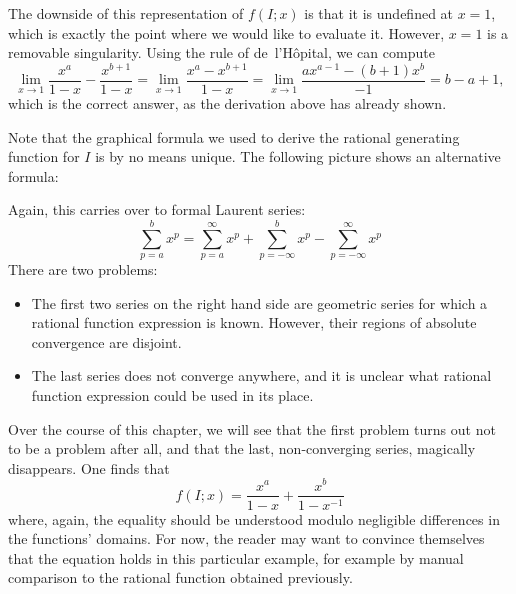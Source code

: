 The downside of this representation of $f(I;x)$ is that it is undefined at $x = 1$,
which is exactly the point where we would like to evaluate it.
However, $x = 1$ is a removable singularity.
Using the rule of de~l'Hôpital, we can compute
\[
  \lim_{x \to 1} \frac{x^a}{1 - x} - \frac{x^{b + 1}}{1 - x} = \lim_{x \to 1} \frac{x^a - x^{b+1}}{1 - x} = \lim_{x \to 1} \frac{a x^{a-1} - (b+1) x^b}{-1} = b - a + 1,
\]
which is the correct answer, as the derivation above has already shown.

Note that the graphical formula we used to derive the rational generating function for $I$ is by no means unique.
The following picture shows an alternative formula:
\begin{center}
\end{center}
Again, this carries over to formal Laurent series:
\[
  \sum_{p = a}^b x^p = \sum_{p = a}^\infty x^p + \sum_{p = -\infty}^b x^p - \sum_{p = -\infty}^\infty x^p
\]
There are two problems:
\begin{itemize}
  \item The first two series on the right hand side are geometric series for which a rational function expression is known.
    However, their regions of absolute convergence are disjoint.
  
  \item The last series does not converge anywhere, and it is unclear what rational function expression could be used in its place.
\end{itemize}
Over the course of this chapter,
we will see that the first problem turns out not to be a problem after all,
and that the last, non-converging series, magically disappears.
One finds that
\[
  f(I;x) = \frac{x^a}{1-x} + \frac{x^b}{1-x^{-1}}
\]
where, again, the equality should be understood modulo negligible differences in the functions' domains.
For now, the reader may want to convince themselves that the equation holds in this particular example,
for example by manual comparison to the rational function obtained previously.

